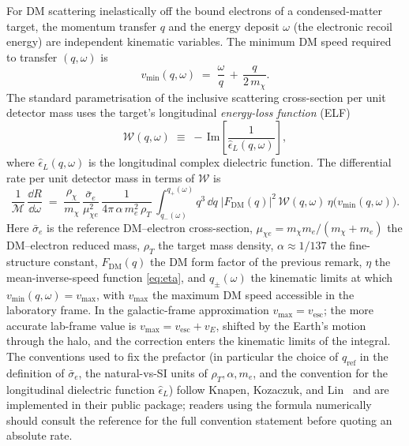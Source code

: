 \begin{statement}
\label{stmt:dme-xsec}
For DM scattering inelastically off the bound electrons of a
condensed-matter target, the momentum transfer $q$ and the energy
deposit $\omega$ (the electronic recoil energy) are independent
kinematic variables. The minimum DM speed required to transfer
$(q,\omega)$ is
\begin{equation}
\label{eq:vmin-electron}
v_\text{min}(q,\omega) \;=\; \frac{\omega}{q} \,+\, \frac{q}{2\,m_\chi}.
\end{equation}
The standard parametrisation of the inclusive scattering
cross-section per unit detector mass uses the target's longitudinal
\emph{energy-loss function} (ELF)
\begin{equation}
\label{eq:elf-def}
\mathcal{W}(q,\omega) \;\equiv\; -\,\text{Im}\!\left[\frac{1}{\hat\epsilon_L(q,\omega)}\right],
\end{equation}
where $\hat\epsilon_L(q,\omega)$ is the longitudinal complex
dielectric function. The differential rate per unit detector mass
in terms of $\mathcal{W}$ is
\begin{equation}
\label{eq:dRdE-electron}
\frac{1}{\mathcal{M}}\,\frac{\dd R}{\dd\omega}
\;=\; \frac{\rho_\chi}{m_\chi}\,
\frac{\bar\sigma_e}{\mu_{\chi e}^2}\,
\frac{1}{4\pi\,\alpha\,m_e^2\,\rho_T}\,
\int_{q_-(\omega)}^{q_+(\omega)}\!\! q^3\,\dd q\;
|F_\text{DM}(q)|^2\,\mathcal{W}(q,\omega)\,\eta\!\bigl(v_\text{min}(q,\omega)\bigr).
\end{equation}
Here $\bar\sigma_e$ is the reference DM--electron cross-section,
$\mu_{\chi e}=m_\chi m_e/(m_\chi+m_e)$ the DM--electron reduced
mass, $\rho_T$ the target mass density, $\alpha\approx 1/137$ the
fine-structure constant, $F_\text{DM}(q)$ the DM form factor of
the previous remark, $\eta$ the mean-inverse-speed function
\cref{eq:eta}, and $q_\pm(\omega)$ the kinematic limits at which
$v_\text{min}(q,\omega)=v_\text{max}$, with $v_\text{max}$ the
maximum DM speed accessible in the laboratory frame. In the
galactic-frame approximation $v_\text{max}=v_\text{esc}$; the more
accurate lab-frame value is $v_\text{max}=v_\text{esc}+v_E$,
shifted by the Earth's motion through the halo, and the
correction enters the kinematic limits of the integral. The
conventions used to
fix the prefactor (in particular the choice of $q_\text{ref}$ in
the definition of $\bar\sigma_e$, the natural-vs-SI units of
$\rho_T,\alpha,m_e$, and the convention for the longitudinal
dielectric function $\hat\epsilon_L$) follow Knapen, Kozaczuk,
and Lin~\cite{knapen2021} and are implemented in their public
package; readers using the formula numerically should consult the
reference for the full convention statement before quoting an
absolute rate.
\end{statement}


